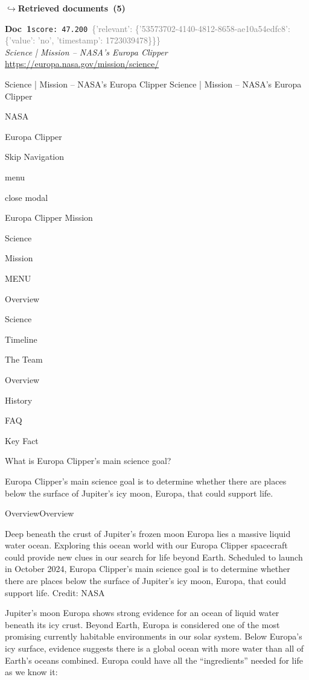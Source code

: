 \documentclass[a4paper,11pt]{article}
\begin{document}
\noindent\hfill{\footnotesize\textcolor{doccolor}{\textbf{$\hookrightarrow$\enspace Retrieved documents~(5)}}}
\begin{docenv}
{\footnotesize\textcolor{doccolor}{\textbf{Doc~1}}}\hfill{\tiny\texttt{score:~47.200}}\ {\tiny\textcolor{gray}{\{'relevant': \{'53573702-4140-4812-8658-ae10a54edfc8': \{'value': 'no', 'timestamp': 1723039478\}\}\}}}\\[3pt]
{\small\textit{Science | Mission – NASA's Europa Clipper}}\\[2pt]
{\tiny\url{https://europa.nasa.gov/mission/science/}}\\[4pt]
{\footnotesize Science | Mission – NASA's Europa Clipper
Science | Mission – NASA's Europa Clipper

NASA

Europa Clipper

Skip Navigation

menu

close modal

Europa Clipper Mission

Science

Mission

MENU

Overview

Science

Timeline

The Team

Overview

History

FAQ

Key Fact

What is Europa Clipper's main science goal? 

Europa Clipper’s main science goal is to determine whether there are places below the surface of Jupiter’s icy moon, Europa, that could support life.

OverviewOverview

Deep beneath the crust of Jupiter’s frozen moon Europa lies a massive liquid water ocean. Exploring this ocean world with our Europa Clipper spacecraft could provide new clues in our search for life beyond Earth. Scheduled to launch in October 2024, Europa Clipper’s main science goal is to determine whether there are places below the surface of Jupiter’s icy moon, Europa, that could support life. Credit: NASA

Jupiter’s moon Europa shows strong evidence for an ocean of liquid water beneath its icy crust. Beyond Earth, Europa is considered one of the most promising currently habitable environments in our solar system. 
Below Europa’s icy surface, evidence suggests there is a global ocean with more water than all of Earth’s oceans combined. Europa could have all the “ingredients” needed for life as we know it: 

}
\end{docenv}
\end{document}
